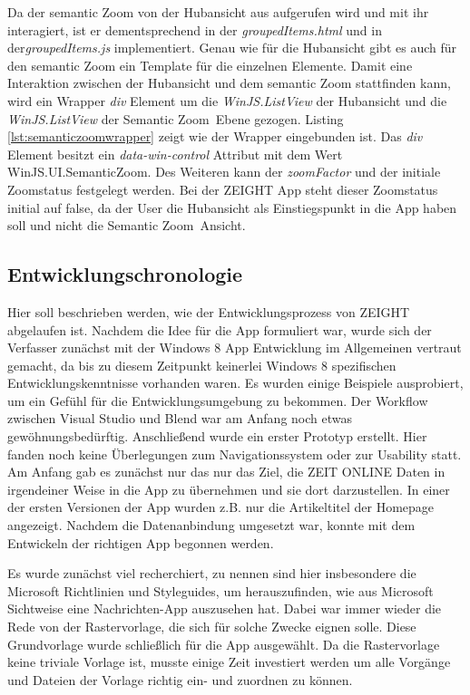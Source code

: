 \documentclass[12pt,a4paper,bibtotoc,abstracton]{scrartcl}
\begin{document}
Da der semantic Zoom von der Hubansicht aus aufgerufen wird und mit ihr interagiert, ist er dementsprechend in der \textit{groupedItems.html} und in der\textit{groupedItems.js} implementiert. Genau wie für die Hubansicht gibt es auch für den semantic Zoom ein Template für die einzelnen Elemente. Damit eine Interaktion zwischen der Hubansicht und dem semantic Zoom stattfinden kann, wird ein Wrapper \textit{div} Element um die \textit{WinJS.ListView} der Hubansicht und die \textit{WinJS.ListView} der \glqq Semantic Zoom\grqq\ Ebene gezogen. Listing \ref{lst:semanticzoomwrapper} zeigt wie der Wrapper eingebunden ist. Das \textit{div} Element besitzt ein \textit{data-win-control} Attribut mit dem Wert \glqq WinJS.UI.SemanticZoom\grqq. Des Weiteren kann der \textit{zoomFactor} und der initiale Zoomstatus festgelegt werden. Bei der ZEIGHT App steht dieser Zoomstatus initial auf \glqq false\grqq, da der User die Hubansicht als Einstiegspunkt in die App haben soll und nicht die \glqq Semantic Zoom\grqq\ Ansicht.

\begin{minipage}{\linewidth}
  
\end{minipage}

\subsection{Entwicklungschronologie}
\label{subsec:entwicklungschronologie}
Hier soll beschrieben werden, wie der Entwicklungsprozess von ZEIGHT abgelaufen ist. Nachdem die Idee für die App formuliert war, wurde sich der Verfasser zunächst mit der Windows 8 App Entwicklung im Allgemeinen vertraut gemacht, da bis zu diesem Zeitpunkt keinerlei Windows 8 spezifischen Entwicklungskenntnisse vorhanden waren. Es wurden einige Beispiele ausprobiert, um ein Gefühl für die Entwicklungsumgebung zu bekommen. Der Workflow zwischen Visual Studio und Blend war am Anfang noch etwas gewöhnungsbedürftig. Anschließend wurde ein erster Prototyp erstellt. Hier fanden noch keine Überlegungen zum Navigationssystem oder zur Usability statt. Am Anfang gab es zunächst nur das nur das Ziel, die ZEIT ONLINE Daten in irgendeiner Weise in die App zu übernehmen und sie dort darzustellen. In einer der ersten Versionen der App wurden z.B. nur die Artikeltitel der Homepage angezeigt. Nachdem die Datenanbindung umgesetzt war, konnte mit dem Entwickeln der richtigen App begonnen werden.

Es wurde zunächst viel recherchiert, zu nennen sind hier insbesondere die Microsoft Richtlinien und Styleguides, um herauszufinden, wie aus Microsoft Sichtweise eine Nachrichten-App auszusehen hat. Dabei war immer wieder die Rede von der Rastervorlage, die sich für solche Zwecke eignen solle. Diese Grundvorlage wurde schließlich für die App ausgewählt. Da die Rastervorlage keine triviale Vorlage ist, musste einige Zeit investiert werden um alle Vorgänge und Dateien der Vorlage richtig ein- und zuordnen zu können. 
\end{document}
